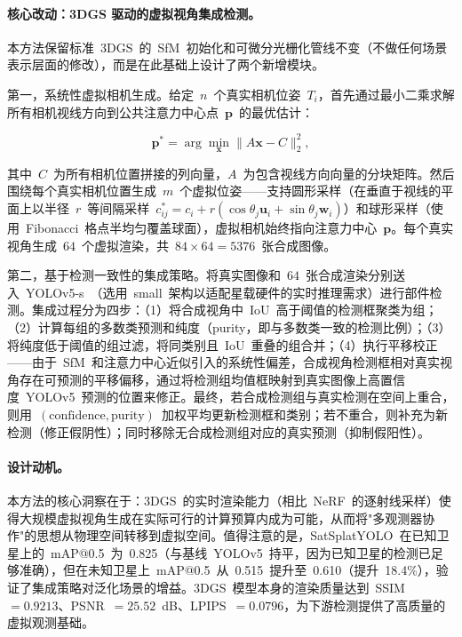 \paragraph{核心改动：3DGS 驱动的虚拟视角集成检测。}
本方法保留标准~3DGS~的~SfM~初始化和可微分光栅化管线不变（不做任何场景表示层面的修改），而是在此基础上设计了两个新增模块。

第一，系统性虚拟相机生成。给定~$n$~个真实相机位姿~$T_i$，首先通过最小二乘求解所有相机视线方向到公共注意力中心点~$\mathbf{p}$~的最优估计：

\begin{equation}
    \mathbf{p}^* = \arg\min_{\mathbf{x}} \|A\mathbf{x} - C\|_2^2,
\end{equation}

其中~$C$~为所有相机位置拼接的列向量，$A$~为包含视线方向向量的分块矩阵。然后围绕每个真实相机位置生成~$m$~个虚拟位姿——支持圆形采样（在垂直于视线的平面上以半径~$r$~等间隔采样~$c^*_{ij} = c_i + r(\cos\theta_j \mathbf{u}_i + \sin\theta_j \mathbf{w}_i)$）和球形采样（使用~Fibonacci~格点半均匀覆盖球面），虚拟相机始终指向注意力中心~$\mathbf{p}$。每个真实视角生成~$64$~个虚拟渲染，共~$84 \times 64 = 5376$~张合成图像。

第二，基于检测一致性的集成策略。将真实图像和~$64$~张合成渲染分别送入~YOLOv5-s~（选用~small~架构以适配星载硬件的实时推理需求）进行部件检测。集成过程分为四步：（1）将合成视角中~IoU~高于阈值的检测框聚类为组；（2）计算每组的多数类预测和纯度（purity，即与多数类一致的检测比例）；（3）将纯度低于阈值的组过滤，将同类别且~IoU~重叠的组合并；（4）执行平移校正——由于~SfM~和注意力中心近似引入的系统性偏差，合成视角检测框相对真实视角存在可预测的平移偏移，通过将检测组均值框映射到真实图像上高置信度~YOLOv5~预测的位置来修正。最终，若合成检测组与真实检测在空间上重合，则用~$(\text{confidence}, \text{purity})$~加权平均更新检测框和类别；若不重合，则补充为新检测（修正假阴性）；同时移除无合成检测组对应的真实预测（抑制假阳性）。

\paragraph{设计动机。}
本方法的核心洞察在于：3DGS~的实时渲染能力（相比~NeRF~的逐射线采样）使得大规模虚拟视角生成在实际可行的计算预算内成为可能，从而将"多观测器协作"的思想从物理空间转移到虚拟空间。值得注意的是，SatSplatYOLO~在已知卫星上的~mAP@0.5~为~0.825（与基线~YOLOv5~持平，因为已知卫星的检测已足够准确），但在未知卫星上~mAP@0.5~从~0.515~提升至~0.610（提升~18.4\%），验证了集成策略对泛化场景的增益。3DGS~模型本身的渲染质量达到~SSIM~$= 0.9213$、PSNR~$= 25.52$~dB、LPIPS~$= 0.0796$，为下游检测提供了高质量的虚拟观测基础。

